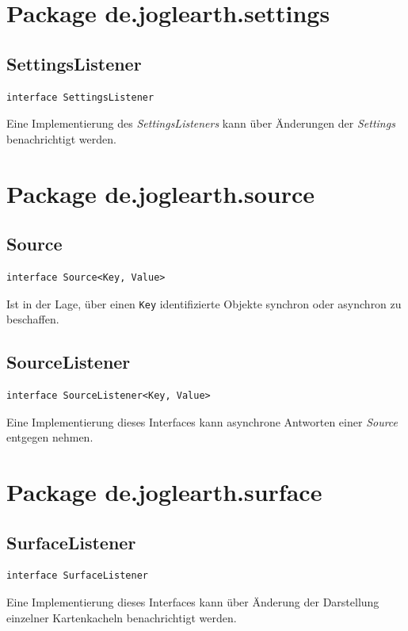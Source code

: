 \documentclass[10pt]{scrreprt}
\begin{document}
\newpage

\vspace{5mm}
\section{Package de.joglearth.settings}
\subsection*{SettingsListener}
\begin{lstlisting}
interface SettingsListener
\end{lstlisting}
Eine Implementierung des \textit{SettingsListeners} kann über Änderungen der \textit{Settings} benachrichtigt werden.\\


\vspace{5mm}
\section{Package de.joglearth.source}
\subsection*{Source}
\begin{lstlisting}
interface Source<Key, Value>
\end{lstlisting}
Ist in der Lage, über einen \texttt{Key} identifizierte Objekte synchron oder asynchron zu beschaffen.\\

\vspace{5mm}
\subsection*{SourceListener}
\begin{lstlisting}
interface SourceListener<Key, Value>
\end{lstlisting}
Eine Implementierung dieses Interfaces kann asynchrone Antworten einer \textit{Source} entgegen nehmen.\\


\vspace{5mm}
\section{Package de.joglearth.surface}
\subsection*{SurfaceListener}
\begin{lstlisting}
interface SurfaceListener
\end{lstlisting}
Eine Implementierung dieses Interfaces kann über Änderung der Darstellung einzelner Kartenkacheln benachrichtigt werden.\\
\end{document}
